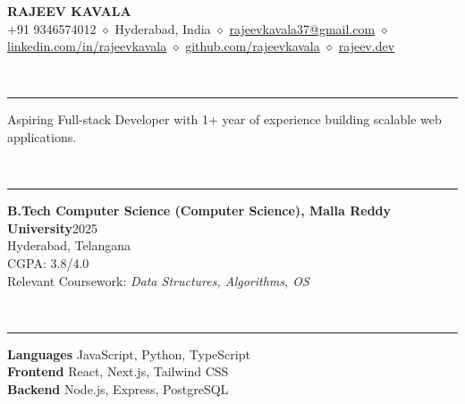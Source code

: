 \documentclass[letterpaper,11pt]{article}
\begin{document}
\begin{center}
  {\LARGE\bfseries RAJEEV KAVALA}\\
  \vspace{2pt}\small +91 9346574012 $\diamond$ Hyderabad, India $\diamond$ {\color{cyan}\href{\detokenize{mailto:rajeevkavala37@gmail.com}}{rajeevkavala37@gmail.com}} $\diamond$ {\color{cyan}\href{\detokenize{https://linkedin.com/in/rajeevkavala}}{linkedin.com/in/rajeevkavala}} $\diamond$ {\color{cyan}\href{\detokenize{https://github.com/rajeevkavala}}{github.com/rajeevkavala}} $\diamond$ {\color{cyan}\href{\detokenize{https://rajeev.dev}}{rajeev.dev}}
\end{center}
\vspace{4pt}
\par
{}\\
\vspace{2pt}\hrule\vspace{4pt}
Aspiring Full-stack Developer with 1+ year of experience building scalable web applications.
\par\vspace{6pt}
\par
{}\\
\vspace{2pt}\hrule\vspace{4pt}
\textbf{B.Tech Computer Science (Computer Science), Malla Reddy University}\hfill 2025\\
\small Hyderabad, Telangana\normalsize\\
CGPA: 3.8/4.0\\
Relevant Coursework: \textit{Data Structures, Algorithms, OS}\\
\par\vspace{3pt}
\par\vspace{6pt}
\par
{}\\
\vspace{2pt}\hrule\vspace{4pt}
\textbf{Languages} \quad JavaScript, Python, TypeScript\\
\textbf{Frontend} \quad React, Next.js, Tailwind CSS\\
\textbf{Backend} \quad Node.js, Express, PostgreSQL\\
\par\vspace{6pt}
\end{document}
